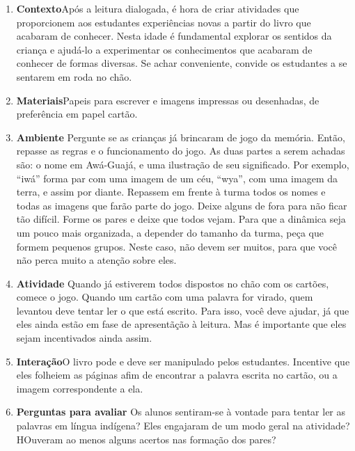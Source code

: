 \documentclass[11pt]{extarticle}
\begin{document}
\begin{enumerate}
\item \textbf{Contexto}\quad Após a leitura dialogada, é hora de criar 
atividades que proporcionem aos estudantes experiências novas a partir do livro
que acabaram de conhecer. Nesta idade é fundamental explorar os sentidos da criança e 
ajudá-lo a experimentar os conhecimentos que acabaram de conhecer de formas diversas. Se achar 
conveniente, convide os estudantes a se sentarem em roda no chão.

\item \textbf{Materiais}\quad Papeis para escrever e imagens impressas ou desenhadas, de preferência
em papel cartão.

\item \textbf{Ambiente}\quad 
Pergunte se as crianças já brincaram de jogo da memória. Então, repasse as regras e o funcionamento
do jogo. As duas partes a serem achadas são: o nome em Awá-Guajá, e uma ilustração de 
seu significado. Por exemplo, ``iwá'' forma par com uma imagem de um céu, ``wya'', com uma imagem da terra,
e assim por diante. Repassem em frente à turma todos os nomes e todas as imagens que farão parte do jogo.
Deixe alguns de fora para não ficar tão difícil. Forme os pares e deixe que todos vejam. 
Para que a dinâmica seja um pouco mais organizada, a depender do tamanho da turma, peça
que formem pequenos grupos. Neste caso, não devem ser muitos, para que você não perca muito
a atenção sobre eles. 

\item \textbf{Atividade}\quad 
Quando já estiverem todos dispostos no chão com os cartões, comece o jogo. 
Quando um cartão com uma palavra for virado, quem levantou deve tentar ler o que está escrito.
Para isso, você deve ajudar, já que eles ainda estão em fase de apresentãção à leitura.
Mas é importante que eles sejam incentivados ainda assim. 


\item \textbf{Interação}\quad O livro pode e deve ser 
manipulado pelos estudantes. Incentive que eles folheiem as páginas afim de encontrar a palavra 
escrita no cartão, ou a imagem correspondente a ela. 


\item \textbf{Perguntas para avaliar}\quad
Os alunos sentiram-se à vontade para tentar ler as palavras em língua 
indígena? Eles engajaram de um modo geral na atividade? 
HOuveram ao menos alguns acertos nas formação dos pares? 


\end{enumerate}
\end{document}
